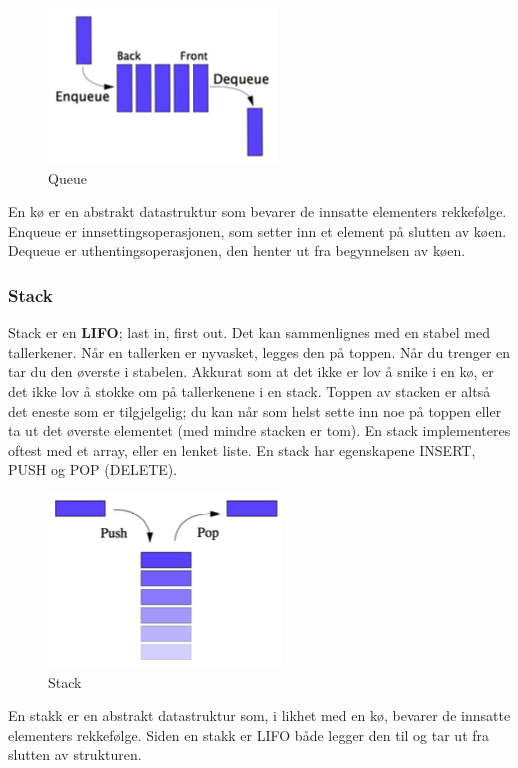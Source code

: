 \begin{figure}[H]
\includegraphics[scale=0.7]{images/ko}
\centering %
\caption{Queue}
\label{fig:ko}
\end{figure}

\noindent En kø er en abstrakt datastruktur som bevarer de innsatte elementers rekkefølge. Enqueue er innsettingsoperasjonen, som setter inn et element på slutten av køen. Dequeue er uthentingsoperasjonen, den henter ut fra begynnelsen av køen.

\subsubsection{Stack}
Stack er en \textbf{LIFO}; last in, first out. Det kan sammenlignes med en stabel med tallerkener. Når en tallerken er nyvasket, legges den på toppen. Når du trenger en tar du den øverste i stabelen. Akkurat som at det ikke er lov å snike i en kø, er det ikke lov å stokke om på tallerkenene i en stack. Toppen av stacken er altså det eneste som er tilgjelgelig; du kan når som helst sette inn noe på toppen eller ta ut det øverste elementet (med mindre stacken er tom). En stack implementeres oftest med et array, eller en lenket liste. En stack har egenskapene INSERT, PUSH og POP (DELETE).

\begin{figure}[H]
\includegraphics[scale=0.7]{images/stack}
\centering %
\caption{Stack}
\label{fig:stack}
\end{figure}

\noindent En stakk er en abstrakt datastruktur som, i likhet med en kø, bevarer de innsatte elementers rekkefølge. Siden en stakk er LIFO både legger den til og tar ut fra slutten av strukturen.

